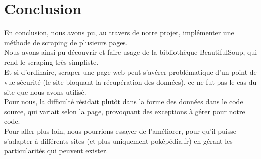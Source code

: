 \documentclass[a4paper, titlepage]{report}
\begin{document}
\section*{Conclusion}
\textnormal{En conclusion, nous avons pu, au travers de notre projet, implémenter une méthode de scraping de plusieurs pages.\\
Nous avons ainsi pu découvrir et faire usage de la bibliothèque BeautifulSoup, qui rend le scraping très simpliste.\\
Et si d'ordinaire, scraper une page web peut s'avérer problématique d'un point de vue sécurité (le site bloquant la récupération des données), ce ne fut pas le cas du site que nous avons utilisé.\\
Pour nous, la difficulté résidait plutôt dans la forme des données dans le code source, qui 	variait selon la page, provoquant des exceptions à gérer pour notre code.\\
Pour aller plus loin, nous pourrions essayer de l'améliorer, pour qu'il puisse s'adapter à différents sites (et plus uniquement poképédia.fr) en gérant les particularités qui peuvent exister.}
\end{document}
